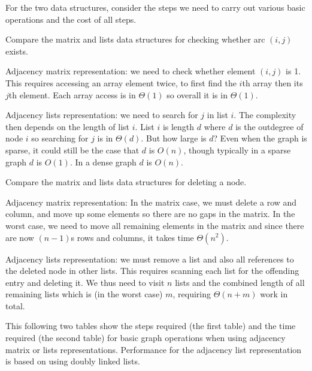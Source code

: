 For the two data structures, consider the steps we need to carry out various basic operations and the cost of all steps. 

\begin{Boxample}[0]
Compare the matrix and lists data structures for checking whether arc $(i,j)$ exists.
 
Adjacency matrix representation: we need to check whether element $(i,j)$ is 1. This requires accessing
an array element twice, to first find the $i$th array then its $j$th element. Each array access is in $\Theta(1)$ so overall it is in $\Theta(1)$.

Adjacency lists representation: we need to search for $j$ in list $i$. The complexity then depends on the length of list $i$. 
List $i$ is length $d$ where $d$ is the outdegree of node $i$ so searching for $j$ is in $\Theta(d)$. 
But how large is $d$? Even when the graph is sparse, it could still be the case that $d$ is $O(n)$, though typically in a sparse graph $d$ is $O(1)$.  
In a dense graph $d$ is $O(n)$.
\end{Boxample}

\begin{Boxample}[0]
Compare the matrix and lists data structures for deleting a node.

Adjacency matrix representation: In the matrix case, we must delete a row and column, 
and move up some elements so there are no gaps in the matrix. 
In the worst case, we need to move all remaining elements in the matrix and since there are now $(n-1)$s rows and columns, it takes time $\Theta(n^2)$.

Adjacency lists representation: we must remove a list and also all references to the deleted node in other lists. 
This requires scanning each list for the offending entry and deleting it. 
We thus need to visit $n$ lists and the combined length of all remaining lists which is (in the worst case) $m$, requiring $\Theta(n+m)$ work in total.
\end{Boxample}

This following two tables  show the steps required (the first table) 
and the time required (the second table) for basic graph operations when using adjacency matrix or lists representations.  
Performance for the adjacency list representation is based on using doubly linked lists.

